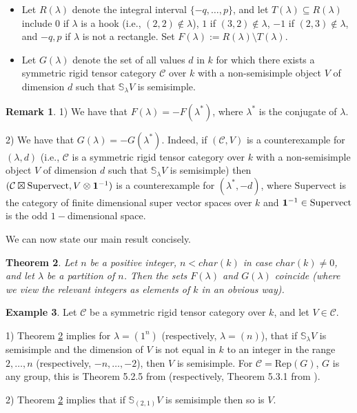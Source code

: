\documentclass{amsart}
\newtheorem{theorem}{Theorem}[section]
\theoremstyle{definition}
\newtheorem{example}[theorem]{Example}
\newtheorem{remark}[theorem]{Remark}
\newcommand{\Supervect}{\text{Supervect}}
\newcommand{\Rep}{\text{Rep}}
\newcommand{\C}{{\mathcal C}}
\newcommand{\unit}{{\bf 1}}
\begin{document}
\begin{itemize}
\item Let $R(\lambda)$ denote the integral interval $\{-q,\dots,p\}$,
and let $T(\lambda)\subseteq R(\lambda)$ include $0$ if $\lambda$ is
a hook (i.e., $(2,2)\notin \lambda$), $1$ if $(3,2)\notin \lambda$,
$-1$ if $(2,3)\notin \lambda$, and $-q,p$ if $\lambda$ is not a
rectangle. Set $F(\lambda):=R(\lambda)\setminus T(\lambda)$.

\item Let $G(\lambda)$ denote the set of all values $d$ in $k$ for
which there exists a symmetric rigid tensor category $\C$ over $k$
with a non-semisimple object $V$ of dimension $d$ such that
$\mathbb{S}_{\lambda}V$ is semisimple.
\end{itemize}

\begin{remark}\label{trick}
1) We have that $F(\lambda)=-F(\lambda^*)$, where $\lambda^*$ is the
conjugate of $\lambda$.

2) We have that $G(\lambda)=-G(\lambda^*)$. Indeed, if $(\C,V)$ is a
counterexample for $(\lambda,d)$ (i.e., $\C$ is a symmetric rigid
tensor category over $k$ with a non-semisimple object $V$ of
dimension $d$ such that $\mathbb{S}_{\lambda}V$ is semisimple) then
$(\C\boxtimes \Supervect,V\otimes \unit^{-1})$ is a counterexample
for $(\lambda^*,-d)$, where $\Supervect$ is the category of finite
dimensional super vector spaces over $k$ and
$\unit^{-1}\in\Supervect$ is the odd $1-$dimensional space.
\end{remark}

We can now state our main result concisely.

\begin{theorem}\label{main}
Let $n$ be a positive integer, $n<char(k)$ in case $char(k)\ne 0$,
and let $\lambda$ be a partition of $n$. Then the sets $F(\lambda)$
and $G(\lambda)$ coincide (where we view the relevant integers as
elements of $k$ in an obvious way).
\end{theorem}

\begin{example}
Let $\C$ be a symmetric rigid tensor category over $k$, and let
$V\in \C$.

1) Theorem \ref{main} implies for $\lambda=(1^n)$ (respectively,
$\lambda=(n)$), that if $\mathbb{S}_{\lambda}V$ is semisimple and
the dimension of $V$ is not equal in $k$ to an integer in the range
$2,\dots,n$ (respectively, $-n,\dots,-2$), then $V$ is semisimple.
For $\C=\Rep(G)$, $G$ is any group, this is Theorem 5.2.5 from
\cite{s1} (respectively, Theorem 5.3.1 from \cite{s1}).

2) Theorem \ref{main} implies that if $\mathbb{S}_{(2,1)}V$ is
semisimple then so is $V$.
\end{example}
\end{document}
